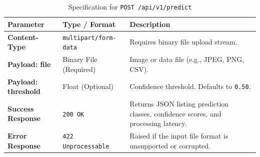 \begin{table}[htbp]
  \centering
  \caption{Specification for \texttt{POST /api/v1/predict}}
  \label{tab:api-predict}
  \small
  \renewcommand{\arraystretch}{1.1}
  \begin{tabularx}{\textwidth}{|l|l|X|}
    \hline
    \textbf{Parameter} & \textbf{Type / Format} & \textbf{Description} \\
    \hline
    \textbf{Content-Type} & \texttt{multipart/form-data} & Requires binary file upload stream. \\
    \textbf{Payload: file} & Binary File (Required) & Image or data file (e.g., JPEG, PNG, CSV). \\
    \textbf{Payload: threshold} & Float (Optional) & Confidence threshold. Defaults to \texttt{0.50}. \\
    \hline
    \textbf{Success Response} & \texttt{200 OK} & Returns JSON listing prediction classes, confidence scores, and processing latency. \\
    \textbf{Error Response} & \texttt{422 Unprocessable} & Raised if the input file format is unsupported or corrupted. \\
    \hline
  \end{tabularx}
\end{table}
